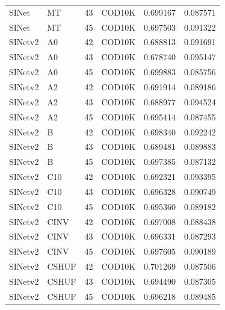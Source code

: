 \begin{table}[p]
\begin{center}
\begin{tabular}{llllcc}
SINet & MT & 43 & COD10K & 0.699167 & 0.087571 \\
SINet & MT & 45 & COD10K & 0.697503 & 0.091322 \\
SINetv2 & A0 & 42 & COD10K & 0.688813 & 0.091691 \\
SINetv2 & A0 & 43 & COD10K & 0.678740 & 0.095147 \\
SINetv2 & A0 & 45 & COD10K & 0.699883 & 0.085756 \\
SINetv2 & A2 & 42 & COD10K & 0.691914 & 0.089186 \\
SINetv2 & A2 & 43 & COD10K & 0.688977 & 0.094524 \\
SINetv2 & A2 & 45 & COD10K & 0.695414 & 0.087455 \\
SINetv2 & B & 42 & COD10K & 0.698340 & 0.092242 \\
SINetv2 & B & 43 & COD10K & 0.689481 & 0.089883 \\
SINetv2 & B & 45 & COD10K & 0.697385 & 0.087132 \\
SINetv2 & C10 & 42 & COD10K & 0.692321 & 0.093395 \\
SINetv2 & C10 & 43 & COD10K & 0.696328 & 0.090749 \\
SINetv2 & C10 & 45 & COD10K & 0.695360 & 0.089182 \\
SINetv2 & CINV & 42 & COD10K & 0.697008 & 0.088438 \\
SINetv2 & CINV & 43 & COD10K & 0.696331 & 0.087293 \\
SINetv2 & CINV & 45 & COD10K & 0.697605 & 0.090189 \\
SINetv2 & CSHUF & 42 & COD10K & 0.701269 & 0.087506 \\
SINetv2 & CSHUF & 43 & COD10K & 0.694490 & 0.087305 \\
SINetv2 & CSHUF & 45 & COD10K & 0.696218 & 0.089485 \\
\bottomrule
\end{tabular}
\end{center}
\end{table}

